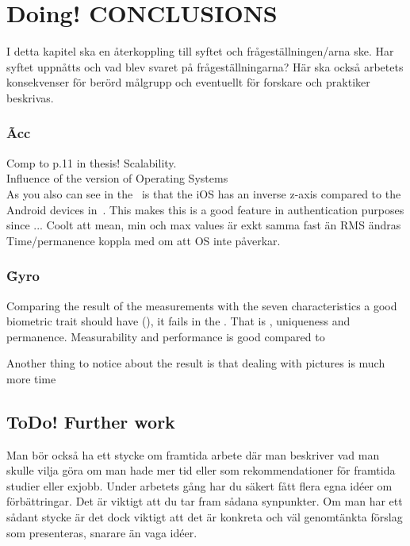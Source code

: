 \chapter{\textbf{Doing! }CONCLUSIONS}\label{cha:conculsions}
I detta kapitel ska en återkoppling till syftet och frågeställningen/arna ske. Har syftet
uppnåtts och vad blev svaret på frågeställningarna? Här ska också arbetets konsekvenser
för berörd målgrupp och eventuellt för forskare och praktiker beskrivas.

\subsection{\~Acc}
Comp to p.11 in thesis!
Scalability.\\
Influence of the version of Operating Systems \\
As you also can see in the~ is that the iOS has an inverse z-axis compared to the Android devices in~. This makes this is a good feature in authentication purposes since ...
Coolt att mean, min och max values är exkt samma fast än RMS ändras
Time/permanence koppla med \cite{sensor:accelPrint} om att OS inte påverkar.

\subsection{\~Gyro} 
Comparing the result of the measurements with the seven characteristics a good biometric trait should have (), it fails in the . That is , uniqueness and permanence. Measurability and  performance is good compared to 

Another thing to notice about the result is that dealing with pictures is much more time 

\section{\textbf{ToDo! }Further work}
Man bör också ha ett stycke om framtida arbete där man beskriver vad man skulle vilja
göra om man hade mer tid eller som rekommendationer för framtida studier eller exjobb.
Under arbetets gång har du säkert fått flera egna idéer om förbättringar. Det är viktigt att
du tar fram sådana synpunkter. Om man har ett sådant stycke är det dock viktigt att det är
konkreta och väl genomtänkta förslag som presenteras, snarare än vaga idéer. 